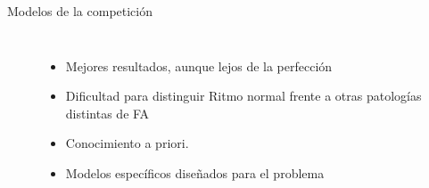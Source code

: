 \begin{frame}{Modelos de la competición}
\begin{columns}
    \centering
        \begin{table}[H]
        \vspace{-1cm}
        \caption{Clasf. RF}
        \begin{center}
        \end{center}
        \end{table}
        
        
        \begin{table}[H]
        \caption{Clasf. Binario en Cascada}
        \begin{center}
        \end{center}
        \end{table}
    
    
    \centering
    \begin{itemize}
        \item Mejores resultados, aunque lejos de la perfección
        \item Dificultad para distinguir Ritmo normal frente a otras patologías distintas de FA
        \item Conocimiento a priori.
        \item Modelos específicos diseñados para el problema
    \end{itemize}
\end{columns}       
\end{frame}

